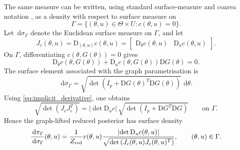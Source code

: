 \documentclass[11pt]{article}
\newcommand{\dd}{\,\mathrm{d}}
\newcommand{\D}{\mathrm{D}}
\newcommand{\abs}[1]{\left\lvert #1\right\rvert}
\newcommand{\sdet}[1]{\sqrt{\det\left(#1\right)}}
\begin{document}
The same measure can be written, using standard surface-measure and coarea notation \cite{Federer1969,EvansGariepy2015}, as a density with respect to surface measure on
\begin{equation}
 \Gamma = \{(\theta,u)\in\Theta\times U: c(\theta,u)=0\}.
\end{equation}
Let \(\dd\sigma_\Gamma\) denote the Euclidean surface measure on \(\Gamma\), and let
\begin{equation}
 J_c(\theta,u)=\D_{(\theta,u)}c(\theta,u)=\begin{bmatrix}\D_\theta c(\theta,u)&\D_u c(\theta,u)\end{bmatrix}.
\end{equation}
On \(\Gamma\), differentiating \(c(\theta,G(\theta))=0\) gives
\begin{equation}
 \D_\theta c(\theta,G(\theta)) + \D_u c(\theta,G(\theta))\D G(\theta)=0.
 \label{eq:implicit_derivative}
\end{equation}
The surface element associated with the graph parametrisation is
\begin{equation}
 \dd\sigma_\Gamma
 =
 \sdet{I_p + \D G(\theta)^T\D G(\theta)}\,\dd\theta .
 \label{eq:surface_element}
\end{equation}
Using \eqref{eq:implicit_derivative}, one obtains
\begin{equation}
 \sdet{J_cJ_c^T}
 =
 \abs{\det \D_u c}\,
 \sdet{I_p + \D G^T\D G}
 \qquad\text{on }\Gamma .
 \label{eq:gram_identity}
\end{equation}
Hence the graph-lifted reduced posterior has surface density
\begin{equation}
 \frac{\dd\pi_\Gamma}{\dd\sigma_\Gamma}(\theta,u)
 =
 \frac{1}{Z_{\rm red}}
 r(\theta,u)
 \frac{\abs{\det\D_u c(\theta,u)}}{\sdet{J_c(\theta,u)J_c(\theta,u)^T}},
 \qquad (\theta,u)\in\Gamma .
 \label{eq:graph_surface_density}
\end{equation}
\end{document}
